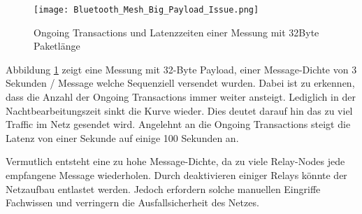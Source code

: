 \begin{figure}[H]
	\centering
	\texttt{[image: Bluetooth\_Mesh\_Big\_Payload\_Issue.png]}
	\caption{Ongoing Transactions und Latenzzeiten einer Messung mit 32Byte Paketlänge}\label{fig:Bluetooth_Mesh_Big_Payload_Issue}
\end{figure}

Abbildung \ref{fig:Bluetooth_Mesh_Big_Payload_Issue} zeigt eine Messung mit 32-Byte Payload, einer Message-Dichte von 3 Sekunden / Message welche Sequenziell versendet wurden. Dabei ist zu erkennen, dass die Anzahl der Ongoing Transactions immer weiter ansteigt. Lediglich in der Nachtbearbeitungszeit sinkt die Kurve wieder. Dies deutet darauf hin das zu viel Traffic im Netz gesendet wird. Angelehnt an die Ongoing Transactions steigt die Latenz von einer Sekunde auf einige 100 Sekunden an.

Vermutlich entsteht eine zu hohe Message-Dichte, da zu viele Relay-Nodes jede empfangene Message wiederholen. Durch deaktivieren einiger Relays könnte der Netzaufbau entlastet werden. Jedoch erfordern solche manuellen Eingriffe Fachwissen und verringern die Ausfallsicherheit des Netzes. 







